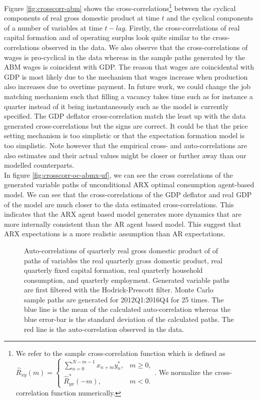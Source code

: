 Figure \ref{fig:crosscorr-abm} shows the cross-correlations\footnote{We refer to the sample cross-correlation function which is defined as 
\\$\widehat{R}_{x y}(m)= \begin{cases}\sum_{n=0}^{N-m-1} x_{n+m} y_n^*, & m \geq 0, \\ \widehat{R}_{y x}^*(-m), & m<0 .\end{cases}$. We normalize the cross-correlation function numerically.} between the cyclical components of real gross domestic product at time $t$ and the cyclical components of a number of variables at time $t - lag$. Firstly, the cross-correlations of real capital formation and of operating surplus look quite similar to the cross-correlations observed in the data. We also observe that the cross-correlations of wages is pro-cyclical in the data whereas in the sample paths generated by the ABM wages is coincident with GDP. The reason that wages are coincidental with GDP is most likely due to the mechanism that wages increase when production also increases due to overtime payment. In future work, we could change the job matching mechanism such that filling a vacancy takes time such as for instance a quarter instead of it being instantaneously such as the model is currently specified. The GDP deflator cross-correlation match the least up with the data generated cross-correlations but the signs are correct. It could be that the price setting mechanism is too simplistic or that the expectation formation model is too simplistic. Note however that the empirical cross- and auto-correlations are also estimates and their actual values might be closer or further away than our modelled counterparts.\\ 

In figure \ref{fig:crosscorr-oc-abmx-uf}, we can see the cross correlations of the generated variable paths of unconditional ARX optimal consumption agent-based model. We can see that the cross-correlations of the GDP deflator and real GDP of the model are much closer to the data estimated cross-correlations. This indicates that the ARX agent based model generates more dynamics that are more internally consistent than the AR agent based model. This suggest that ARX expectations is a more realistic assumption than AR expectations.

\begin{figure}
    \centering
    
		\caption{Auto-correlations of quarterly real gross domestic product of of paths of variables the real quarterly gross domestic product, real quarterly fixed capital formation, real quarterly household consumption, and quarterly employment. Generated variable paths are first filtered with the Hodrick-Prescott filter. Monte Carlo sample paths are generated for 2012Q1:2016Q4 for 25 times. The blue line is the mean of the calculated auto-correlation whereas the blue error-bar is the standard deviation of the calculated paths. The red line is the auto-correlation observed in the data. }
    \label{fig:autocorr-abm}
\end{figure}


